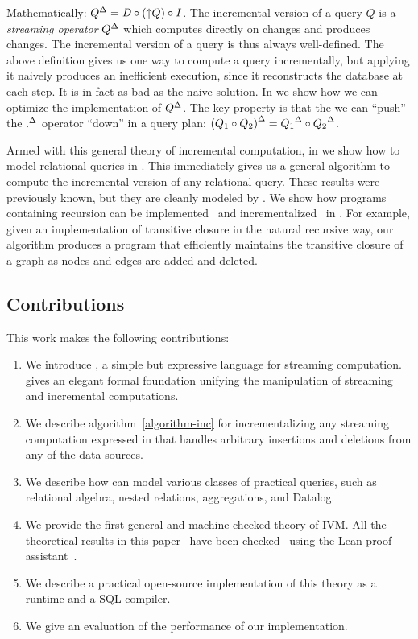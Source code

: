 %
Mathematically: ${Q}^{\Delta} = \mathit{D} \circ ({\uparrow}Q) \circ \mathit{I}$.  The
incremental version of a query $Q$ is a \emph{streaming operator}
${Q}^{\Delta}$ which computes directly on changes and produces changes.
The incremental version of a query is thus always well-defined.  The
above definition gives us one way to compute a query incrementally,
but applying it naively produces an inefficient execution, since it
reconstructs the database at each step.  It is in fact as bad as the
naive solution.  In  we show how we can
optimize the implementation of ${Q}^{\Delta}$. The key property is that the
we can ``push'' the ${.}^{\Delta}$ operator ``down'' in a query plan:
${(Q_1 \circ Q_2)}^{\Delta} = {Q_1}^{\Delta} \circ {Q_2}^{\Delta}$.

Armed with this general theory of incremental computation, in
 we show how to model relational queries in
\dbsp.  This immediately gives us a general algorithm to compute the
incremental version of any relational query.  These results were
previously known, but they are cleanly modeled by \dbsp.  We show how
programs containing recursion can be
implemented~ and
incrementalized~ in \dbsp.  For example, given an
implementation of transitive closure in the natural recursive way, our
algorithm produces a program that efficiently maintains the transitive
closure of a graph as nodes and edges are added and deleted.

\subsection{Contributions}

This work makes the following contributions:
\begin{enumerate}
  \item We introduce \dbsp, a simple but expressive language for
    streaming computation. \dbsp gives an elegant formal foundation
    unifying the manipulation of streaming and incremental
    computations.
  \item We describe algorithm~\ref{algorithm-inc} for incrementalizing
    any streaming computation expressed in \dbsp that handles
    arbitrary insertions and deletions from any of the data sources.
  \item We describe how \dbsp can model various classes of practical
    queries, such as relational algebra, nested relations,
    aggregations, and Datalog.
  \item We provide the first general and machine-checked theory of
    IVM.  All the theoretical results in this
    paper~\cite{budiu-vldb23} have been checked~\cite{dbsp-theory}
    using the Lean proof assistant~\cite{moura-cade15}.
  \item We describe a practical open-source implementation of this
    theory as a runtime and a SQL compiler.
  \item We give an evaluation of the performance of our
    implementation.
\end{enumerate}
